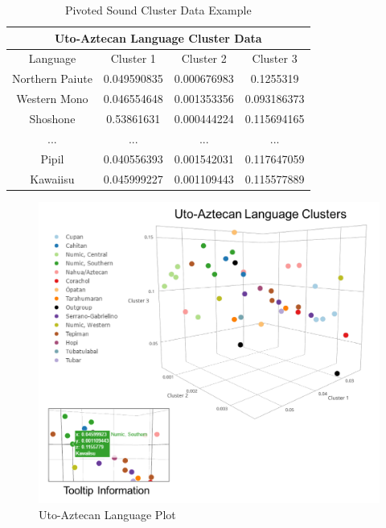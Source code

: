 \documentclass{article}
\begin{document}
\begin{table}
\centering
\begin{tabular}{|c| c c c |}
 \hline
 \multicolumn{4}{|c|}{\textbf{Uto-Aztecan Language Cluster Data}} \\
 \hline
 Language&Cluster 1&Cluster 2&Cluster 3\\
 \hline
 Northern Paiute&0.049590835&0.000676983&0.1255319\\
 Western Mono&0.046554648&0.001353356&0.093186373\\
 Shoshone&0.53861631&0.000444224&0.115694165\\
 ...&...&...&...\\
 Pipil&0.040556393&0.001542031&0.117647059\\
 Kawaiisu&0.045999227&0.001109443&0.115577889\\
 \hline
\end{tabular}
\caption{Pivoted Sound Cluster Data Example}
\label{table:uadata_pivot}
\end{table}

\begin{figure}[h!]
\centering
\includegraphics[width=\textwidth]{uaplot1.png}
\caption{Uto-Aztecan Language Plot}
\label{fig:uaplot1}
\end{figure}



\end{document}

